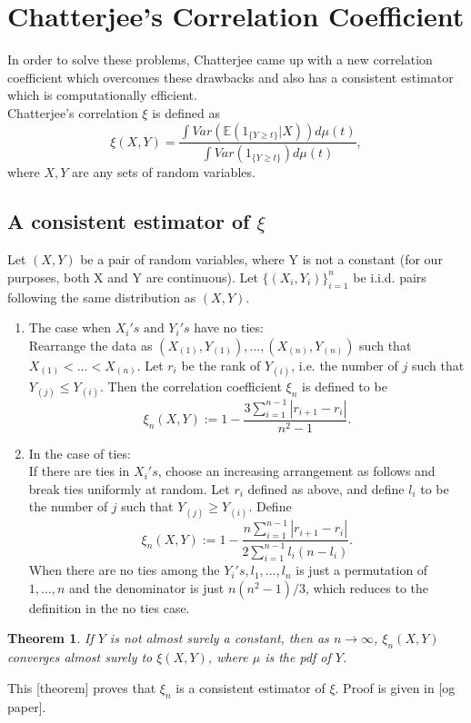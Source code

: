 \documentclass{article}
\newtheorem{theorem}{Theorem}[section]
\begin{document}
\section{Chatterjee's Correlation Coefficient}
	In order to solve these problems, Chatterjee came up with a new correlation coefficient which overcomes these drawbacks and also has a consistent estimator which is computationally efficient.\\
	Chatterjee's correlation $\xi$ is defined as
	$$\xi(X, Y) = \frac{\int Var(\mathbb{E}(1_{\{Y \geq t\}}|X)) d\mu(t)}{\int Var(1_{\{Y \geq t\}}) d\mu(t)},$$
	where $X, Y$ are any sets of random variables.

	\subsection{A consistent estimator of $\xi$}
		Let $(X, Y)$ be a pair of random variables, where Y is not a constant (for our purposes, both X and Y are continuous).
		Let $\{(X_i, Y_i)\}_{i = 1}^{n}$ be i.i.d. pairs following the same distribution as $(X, Y)$.
		\begin{enumerate}
			\item The case when $X_i's \text{ and } Y_i's$ have no ties: \\
			Rearrange the data as $(X_{(1)}, Y_{(1)}), \dots, (X_{(n)}, Y_{(n)})$ such that $X_{(1)} < \dots < X_{(n)}$. Let $r_i$ be the rank of $Y_{(i)}$, i.e. the number of $j$ such that $Y_{(j)} \leq Y_{(i)}$.  Then the correlation coefficient $\xi_n$ is defined to be
			$$\xi_n(X, Y) := 1-\frac{3\sum_{i=1}^{n-1} |r_{i+1} - r_i|}{n^2-1}.$$

			\item In the case of ties:\\
			If there are ties in $X_i's$, choose an increasing arrangement as follows and break ties uniformly at random. Let $r_i$ defined as above, and define $l_i$ to be the number of $j$ such that $Y_{(j)} \geq Y_{(i)}$. Define
			$$\xi_n(X, Y) := 1-\frac{n\sum_{i=1}^{n-1} |r_{i+1} - r_i|}{2\sum_{i=1}^{n-1}l_i(n-l_i)}.$$
			When there are no ties among the $Y_i's, l_1, \dots, l_n$ is just a permutation of $1, \dots, n$ and the denominator is just $n(n^2-1)/3$, which reduces to the definition in the no ties case.\\
		\end{enumerate}
		\begin{theorem}
			If $Y$ is not almost surely a constant, then as $n \rightarrow \infty$, $\xi_n(X, Y)$ converges almost surely to $\xi(X, Y)$, where $\mu$ is the pdf of $Y$.
		\end{theorem}
		This [theorem] proves that $\xi_n$ is a consistent estimator of $\xi$. Proof is given in [og paper].
\end{document}
